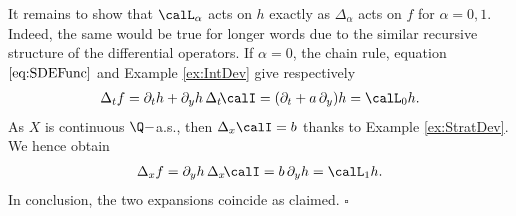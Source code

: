 \begin{example}
It remains to show that $\calL_\alpha$ acts on $h$ exactly as $\Delta_\alpha$ acts on $f$ for $\alpha=0,1$. Indeed, the same would be true for longer words due to the similar recursive structure of the differential operators. If $\alpha=0$, the chain rule, equation $\eqref{eq:SDEFunc}$ and Example \ref{ex:IntDev} give respectively 
\begin{align*}
    \Delta_{t}f = \partial_t h + \partial_y h \, \Delta_t\! \calI = (\partial_t  + a \, \partial_y)h = \calL_0 h.
\end{align*}
As $X$ is continuous $\Q-$a.s., then $\Delta_x\calI=b$ thanks to Example \ref{ex:StratDev}. We hence obtain %
\begin{align*}
    \Delta_{x}f = \partial_y h \, \Delta_x \!\calI = b \, \partial_y h = \calL_1 h.
\end{align*}
In conclusion, the two expansions coincide as claimed.
\hfill $\square$



\end{example}


